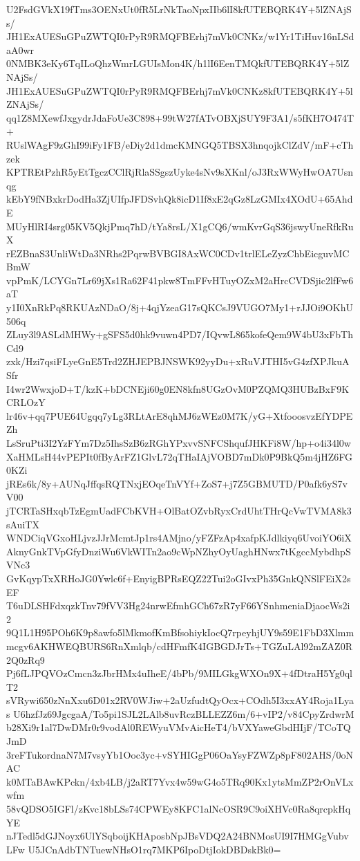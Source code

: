U2FsdGVkX19fTms3OENxUt0fR5LrNkTaoNpxIIb6lI8kfUTEBQRK4Y+5lZNAjSs/
JH1ExAUESuGPuZWTQI0rPyR9RMQFBErhj7mVk0CNKz/w1Yr1TiHuv16nLSdaA0wr
0NMBK3eKy6TqILoQhzWmrLGUIsMon4K/h1lI6EenTMQkfUTEBQRK4Y+5lZNAjSs/
JH1ExAUESuGPuZWTQI0rPyR9RMQFBErhj7mVk0CNKz8kfUTEBQRK4Y+5lZNAjSs/
qq1Z8MXewfJxgydrJdaFoUe3C898+99tW27fATvOBXjSUY9F3A1/s5fKH7O474T+
RUslWAgF9zGhI99iFy1FB/eDiy2d1dmcKMNGQ5TBSX3hnqojkClZdV/mF+cThzek
KPTREtPzhR5yEtTgczCClRjRlaSSgszUyke4sNv9sXKnl/oJ3RxWWyHwOA7Usnqg
kEbY9fNBxkrDodHa3ZjUIfpJFDSvhQk8icD1If8xE2qGz8LzGMIx4XOdU+65AhdE
MUyHlRI4srg05KV5QkjPmq7hD/tYa8rsL/X1gCQ6/wmKvrGqS36jswyUneRfkRuX
rEZBnaS3UnliWtDa3NRhs2PqrwBVBGI8AxWC0CDv1trlELeZyzChbEicguvMCBmW
vpPmK/LCYGn7Lr69jXs1Ra62F41pkw8TmFFvHTuyOZxM2aHrcCVDSjic2lfFw6aT
y1I0XnRkPq8RKUAzNDaO/8j+4qjYzeaG17sQKCsJ9VUGO7My1+rJJOi9OKhU506q
ZLuy3l9ASLdMHWy+gSFS5d0hk9vuwn4PD7/IQvwL865kofeQem9W4bU3xFbThCd9
zxk/Hzi7qsiFLyeGnE5Trd2ZHJEPBJNSWK92yyDu+xRuVJTHI5vG4zfXPJkuASfr
I4wr2WwxjoD+T/kzK+bDCNEji60g0EN8kfn8UGzOvM0PZQMQ3HUBzBxF9KCRLOzY
lr46v+qq7PUE64Ugqq7yLg3RLtArE8qhMJ6zWEz0M7K/yG+XtfooosvzEfYDPEZh
LsSruPti3I2YzFYm7Dz5IhsSzB6zRGhYPxvvSNFCShqufJHKFi8W/hp+o4i34l0w
XaHMLsH44vPEPIt0fByArFZ1GlvL72qTHaIAjVOBD7mDk0P9BkQ5m4jHZ6FG0KZi
jREs6k/8y+AUNqJffqsRQTNxjEOqeTnVYf+ZoS7+j7Z5GBMUTD/P0afk6yS7vV00
jTCRTaSHxqbTzEgmUadFCbKVH+OlBatOZvbRyxCrdUhtTHrQcVwTVMA8k3sAuiTX
WNDCiqVGxoHLjvzJJrMcmtJp1rs4AMjno/yFZFzAp4xafpKJdlkiyq6UvoiYO6iX
AknyGnkTVpGfyDnziWu6VkWITn2ao9cWpNZhyOyUaghHNwx7tKgccMybdhpSVNc3
GvKqypTxXRHoJG0Ywlc6f+EnyigBPRsEQZ22Tui2oGIvxPh35GnkQNSlFEiX2sEF
T6uDLSHFdxqzkTnv79fVV3Hg24nrwEfmhGCh67zR7yF66YSnhmeniaDjaocWs2i2
9Q1L1H95POh6K9p8awfo5lMkmofKmBfsohiykIocQ7rpeyhjUY9s59E1FbD3Xlmm
mcgv6AKHWEQBURS6RnXmlqb/cdHFmfK4IGBGDJrTs+TGZuLAl92mZAZ0R2Q0zRq9
Pj6fLJPQVOzCmcn3zJbrHMx4uIheE/4bPb/9MILGkgWXOn9X+4fDtraH5Yg0qlT2
sVRywi650zNnXxu6D01x2RV0WJiw+2aUzfudtQyOcx+COdh5I3xxAY4Roja1Lyas
U6hzfJz69JgcgaA/To5pi1SJL2LAlb8uvRczBLLEZZ6m/6+vIP2/v84CpyZrdwrM
b28Xi9r1al7DwDMr0r9vodAl0REWyuVMvAicHeT4/bVXYaweGbdHIjF/TCoTQJmD
3reFTukordnaN7M7vsyYb1Ooc3yc+vSYHIGgP06OaYsyFZWZp8pF802AHS/0oNAC
k0MTaBAwKPckn/4xb4LB/j2aRT7Yvx4w59wG4o5TRq90Kx1ytsMmZP2rOnVLxwfm
58vQDSO5IGFl/zKvc18bLSs74CPWEy8KFC1alNcOSR9C9oiXHVc0Ra8qrcpkHqYE
nJTedl5dGJNoyx6UlYSqboijKHAposbNpJBsVDQ2A24BNMosUI9I7HMGgVubvLFw
U5JCnAdbTNTuewNHsO1rq7MKP6IpoDtjIokDBDskBk0=
